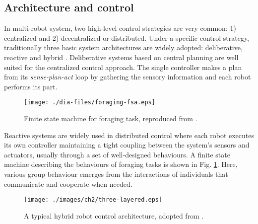 \subsection*{Architecture and control}
\label{bg:mrs:arch}
In multi-robot system, two high-level control strategies are very common: 1) centralized and 2) decentralized or distributed. Under a specific control strategy, traditionally three basic system architectures are widely adopted: deliberative, reactive and hybrid \cite{Arkin1998}. Deliberative systems based on central planning are well suited for the centralized control approach. The single controller makes a plan from its {\em sense-plan-act} loop by gathering the sensory information and each robot performs its part.
\begin{figure}[H]
\begin{center}
\texttt{[image: ./dia-files/foraging-fsa.eps]} %
\caption{Finite state machine for foraging task, reproduced from \protect{}.} 
\label{fig:foraging-fsa}
\end{center}
\end{figure}

Reactive systems are widely used in distributed control where each robot executes its own controller maintaining a tight coupling between the system's sensors and actuators, usually through a set of well-designed behaviours. A finite state machine describing the behaviours of foraging tasks is shown in Fig. \ref{fig:foraging-fsa}. Here, various group behaviour emerges from the interactions of individuals that communicate and cooperate when needed. 
\begin{figure}[H]
\begin{center}
\texttt{[image: ./images/ch2/three-layered.eps]} %
\caption{A typical hybrid robot control architecture, adopted from \protect{}.} 
\label{fig:three-layer-arch}
\end{center}
\end{figure}

